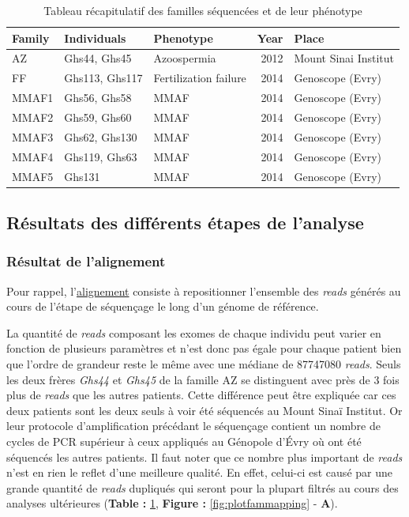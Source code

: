 \documentclass[12pt,twoside]{reedthesis}
\theoremstyle{definition}
\theoremstyle{definition}
\theoremstyle{remark}
\begin{document}
  \begin{longtable}[t]{lllrl}
  \caption{\label{tab:tabfam}Tableau récapitulatif des familles séquencées et de leur phénotype}\\
  \toprule
  Family & Individuals & Phenotype & Year & Place\\
  \midrule
  AZ & Ghs44, Ghs45 & Azoospermia & 2012 & Mount Sinai Institut\\
  FF & Ghs113, Ghs117 & Fertilization failure & 2014 & Genoscope (Evry)\\
  MMAF1 & Ghs56, Ghs58 & MMAF & 2014 & Genoscope (Evry)\\
  MMAF2 & Ghs59, Ghs60 & MMAF & 2014 & Genoscope (Evry)\\
  MMAF3 & Ghs62, Ghs130 & MMAF & 2014 & Genoscope (Evry)\\
  \addlinespace
  MMAF4 & Ghs119, Ghs63 & MMAF & 2014 & Genoscope (Evry)\\
  MMAF5 & Ghs131 & MMAF & 2014 & Genoscope (Evry)\\
  \bottomrule
  \end{longtable}
  
  \newpage 
  
  \subsection{Résultats des différents étapes de
  l'analyse}\label{resultats-des-differents-etapes-de-lanalyse}
  
  \subsubsection{Résultat de l'alignement}\label{resultat-de-lalignement}
  
  Pour rappel, l'\href{\%7B\#lalignement\%7D}{alignement} consiste à
  repositionner l'ensemble des \emph{reads} générés au cours de l'étape de
  séquençage le long d'un génome de référence.
  
  La quantité de \emph{reads} composant les exomes de chaque individu peut
  varier en fonction de plusieurs paramètres et n'est donc pas égale pour
  chaque patient bien que l'ordre de grandeur reste le même avec une
  médiane de 87747080 \emph{reads}. Seuls les deux frères \emph{Ghs44} et
  \emph{Ghs45} de la famille AZ se distinguent avec près de 3 fois plus de
  \emph{reads} que les autres patients. Cette différence peut être
  expliquée car ces deux patients sont les deux seuls à voir été séquencés
  au Mount Sinaï Institut. Or leur protocole d'amplification précédant le
  séquençage contient un nombre de cycles de PCR supérieur à ceux
  appliqués au Génopole d'Évry où ont été séquencés les autres patients.
  Il faut noter que ce nombre plus important de \emph{reads} n'est en rien
  le reflet d'une meilleure qualité. En effet, celui-ci est causé par une
  grande quantité de \emph{reads} dupliqués qui seront pour la plupart
  filtrés au cours des analyses ultérieures (\textbf{Table :}
  \ref{tab:tabfam}, \textbf{Figure : }\ref{fig:plotfammapping} -
  \textbf{A}).
  
\end{document}

